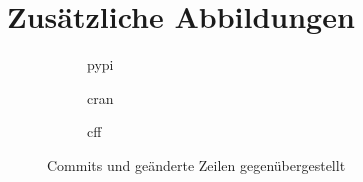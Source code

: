 \chapter{Zusätzliche Abbildungen}
\label{chap:zusaetzliche_abbildungen}

\begin{figure}[H]
    \begin{subfigure}{.5\textwidth}
        \centering
        
        \caption{\gls{pypi}}
        \label{fig:commits_vs_changed_lines_pypi}
    \end{subfigure}%
    \begin{subfigure}{.5\textwidth}
        \centering
        
        \caption{\gls{cran}}
        \label{fig:commits_vs_changed_lines_cran}
    \end{subfigure}
    \centering
    \begin{subfigure}{.5\textwidth}
        \centering
        
        \caption{\gls{cff}}
        \label{fig:commits_vs_changed_lines_cff}
    \end{subfigure}
    \caption{Commits und geänderte Zeilen gegenübergestellt}
    \label{fig:commits_vs_changed_lines_anhang}
\end{figure}

